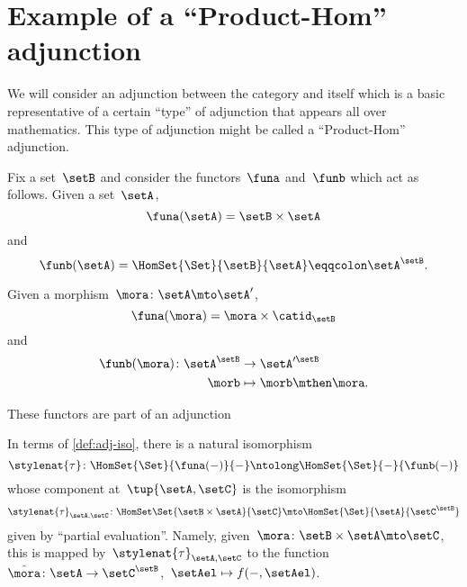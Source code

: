 \section{Example of a ``Product-Hom'' adjunction}
We will consider an adjunction between the category \Set and itself which is a basic representative of a certain ``type'' of adjunction that appears all over mathematics.
This type of adjunction might be called a ``Product-Hom'' adjunction.

Fix a set~$\setB$ and consider the functors~$\funa$ and~$\funb$ which act as follows.
Given a set~$\setA$,
\begin{equation*}
  \funa(\setA) = \setB \times \setA
\end{equation*}
and
\begin{equation*}
  \funb(\setA) = \HomSet{\Set}{\setB}{\setA} \eqqcolon \setA^\setB.
\end{equation*}

Given a morphism~$\mora\colon \setA \mto \setA'$,
\begin{equation*}
  \funa(\mora) = \mora \times \catid_\setB
\end{equation*}
and
\begin{equation*}
  \begin{aligned}
    \funb(\mora)\colon \setA^\setB &\to \setA'^\setB\\
    \morb &\mapsto \morb \mthen \mora.
  \end{aligned}
\end{equation*}

These functors are part of an adjunction

\begin{center}
\end{center}
In terms of \cref{def:adj-iso}, there is a natural isomorphism
\begin{equation*}
  \stylenat{\tau}\colon \HomSet{\Set}{\funa(- )}{-}  \ntolong   \HomSet{\Set}{-}{\funb( - )}
\end{equation*}
whose component at~$\tup{\setA,\setC}$ is the isomorphism
\begin{equation*}
  \stylenat{\tau}_{\setA,\setC} \colon \HomSet\Set{\setB\times \setA}{\setC} \mto \HomSet{\Set}{\setA}{\setC^\setB}
\end{equation*}
given by ``partial evaluation''.
Namely, given~$\mora \colon \setB \times \setA \mto \setC$, this is mapped by~$\stylenat{\tau}_{\setA,\setC}$ to the function~$\hat \mora \colon \setA \to \setC^\setB$,~$\setAel \mapsto f( -, \setAel)$.

